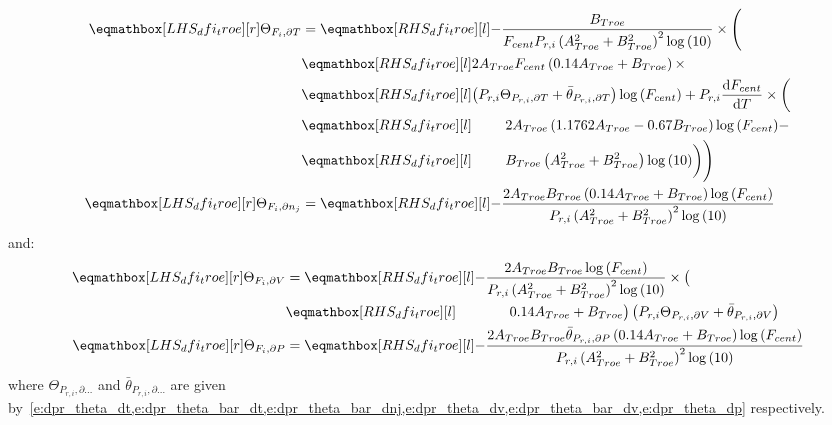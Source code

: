 \documentclass[12pt]{article}
\begin{document}
\begin{align}
\label{e:dfi_troe_dt_prod}
\lhs{dfi_troe}{\Theta_{F_i, \partial T}} &= 
\rhs{dfi_troe}{ - \frac{B_{Troe}}{F_{cent} P_{r, i} \left(A_{Troe}^{2} + B_{Troe}^{2}\right)^{2} \log{\left (10 \right )}} \times \Biggl(} \nonumber \\
&\rhs{dfi_troe}{ 2 A_{Troe} F_{cent} \left(0.14 A_{Troe} + B_{Troe}\right) \times } \nonumber \\
&\rhs{dfi_troe}{\left( P_{r, i} \Theta_{P_{r,i}, \partial T} + \bar{\theta}_{P_{r, i}, \partial T}\right) \log{\left (F_{cent} \right )} + P_{r, i} \frac{\text{d} F_{cent} }{\text{d} T } \times \biggl(} \nonumber \\
&\rhs{dfi_troe}{\mathindent 2 A_{Troe} \left(1.1762 A_{Troe} - 0.67 B_{Troe}\right) \log{\left (F_{cent} \right )} - } \nonumber \\
&\rhs{dfi_troe}{\mathindent B_{Troe} \left(A_{Troe}^{2} + B_{Troe}^{2}\right) \log{\left (10 \right )}\biggr)\Biggr)} \\
\label{e:dfi_troe_dnj_prod}
\lhs{dfi_troe}{\Theta_{F_i, \partial n_j}} &= \rhs{dfi_troe}{- \frac{2 A_{Troe} B_{Troe} \left(0.14 A_{Troe} + B_{Troe}\right) \log{\left (F_{cent} \right )}}{P_{r, i} \left(A_{Troe}^{2} + B_{Troe}^{2}\right)^{2} \log{\left (10 \right )}}}
\end{align}
and:
\begin{subequations}
 \label{e:dfi_troe_de_prod}
 \begin{align}
   \lhs{dfi_troe}{\Theta_{F_i, \partial V}} &= \rhs{dfi_troe}{- \frac{2 A_{Troe} B_{Troe} \log{\left (F_{cent} \right )}}{P_{r, i} \left(A_{Troe}^{2} + B_{Troe}^{2}\right)^{2} \log{\left (10 \right )}} \times \bigl(} \nonumber \\
					    & \rhs{dfi_troe}{\mathindent[alittlebit] 0.14 A_{Troe} + B_{Troe}\bigr) \left(P_{r, i} \Theta_{P_{r,i}, \partial V} + \bar{\theta}_{P_{r, i}, \partial V}\right)} \\
   \lhs{dfi_troe}{\Theta_{F_i, \partial P}} &= \rhs{dfi_troe}{- \frac{2 A_{Troe} B_{Troe} \bar{\theta}_{P_{r, i}, \partial P} \left(0.14 A_{Troe} + B_{Troe}\right) \log{\left (F_{cent} \right )}}{P_{r, i} \left(A_{Troe}^{2} + B_{Troe}^{2}\right)^{2} \log{\left (10 \right )}}}
 \end{align}
\end{subequations}
where $\Theta_{P_{r,i}, \partial \ldots}$ and $\bar{\theta}_{P_{r, i}, \partial \ldots}$ are given by~\cref{e:dpr_theta_dt,e:dpr_theta_bar_dt,e:dpr_theta_bar_dnj,e:dpr_theta_dv,e:dpr_theta_bar_dv,e:dpr_theta_dp} respectively.
\end{document}
